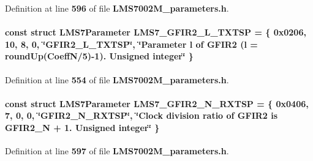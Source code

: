 Definition at line {\bf 596} of file {\bf L\+M\+S7002\+M\+\_\+parameters.\+h}.

\paragraph[{L\+M\+S7\+\_\+\+G\+F\+I\+R2\+\_\+\+L\+\_\+\+T\+X\+T\+SP}]{\setlength{\rightskip}{0pt plus 5cm}const struct {\bf L\+M\+S7\+Parameter} L\+M\+S7\+\_\+\+G\+F\+I\+R2\+\_\+\+L\+\_\+\+T\+X\+T\+SP = \{ 0x0206, 10, 8, 0, \char`\"{}\+G\+F\+I\+R2\+\_\+\+L\+\_\+\+T\+X\+T\+S\+P\char`\"{}, \char`\"{}\+Parameter l of G\+F\+I\+R2 (l = round\+Up(\+Coeff\+N/5)-\/1). Unsigned integer\char`\"{} \}\hspace{0.3cm}{\ttfamily [static]}}\label{LMS7002M__parameters_8h_a5f100e198dfeaf98bdc112453fd7903c}


Definition at line {\bf 554} of file {\bf L\+M\+S7002\+M\+\_\+parameters.\+h}.

\paragraph[{L\+M\+S7\+\_\+\+G\+F\+I\+R2\+\_\+\+N\+\_\+\+R\+X\+T\+SP}]{\setlength{\rightskip}{0pt plus 5cm}const struct {\bf L\+M\+S7\+Parameter} L\+M\+S7\+\_\+\+G\+F\+I\+R2\+\_\+\+N\+\_\+\+R\+X\+T\+SP = \{ 0x0406, 7, 0, 0, \char`\"{}\+G\+F\+I\+R2\+\_\+\+N\+\_\+\+R\+X\+T\+S\+P\char`\"{}, \char`\"{}\+Clock division ratio of G\+F\+I\+R2 is G\+F\+I\+R2\+\_\+\+N + 1. Unsigned integer\char`\"{} \}\hspace{0.3cm}{\ttfamily [static]}}\label{LMS7002M__parameters_8h_afeed18d27536bf80fcecf8df74c699eb}


Definition at line {\bf 597} of file {\bf L\+M\+S7002\+M\+\_\+parameters.\+h}.


